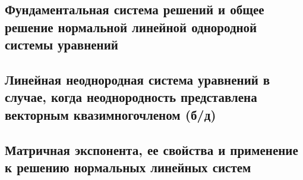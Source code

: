 \subsection{Фундаментальная система решений и общее решение нормальной линейной однородной системы уравнений}



\subsection{Линейная неоднородная система уравнений в случае, когда неоднородность представлена векторным квазимногочленом (б/д)}



\newpage

\subsection{Матричная экспонента, ее свойства и применение к решению нормальных линейных систем}



\newpage